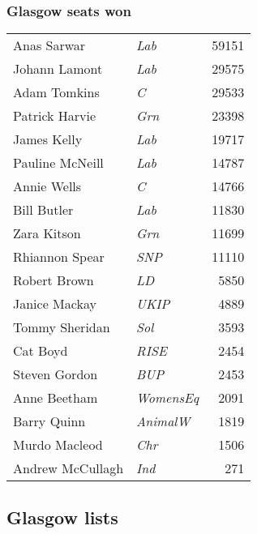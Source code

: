 \subsubsection*{Glasgow seats won}

{\footnotesize
\begin{tabular*}{\columnwidth}{@{\extracolsep{\fill}} p{} >{\itshape}l r @{\extracolsep{\fill}}}
	Anas Sarwar & Lab & 59151\\
	Johann Lamont & Lab & 29575\\%
	Adam Tomkins & C & 29533\\
	Patrick Harvie & Grn & 23398\\
	James Kelly & Lab & 19717\\%
	Pauline McNeill & Lab & 14787\\%
	Annie Wells & C & 14766\\%
	\hline
	Bill Butler & Lab & 11830\\%
	Zara Kitson & Grn & 11699\\%
	Rhiannon Spear & SNP & 11110\\%
	Robert Brown & LD & 5850\\
	Janice Mackay & UKIP & 4889\\
	Tommy Sheridan & Sol & 3593\\
	Cat Boyd & RISE & 2454\\
	Steven Gordon & BUP & 2453\\
	Anne Beetham & WomensEq & 2091\\
	Barry Quinn & AnimalW & 1819\\
	Murdo Macleod & Chr & 1506\\
	Andrew McCullagh & Ind & 271\\
\end{tabular*}

}

\subsection*{Glasgow lists}

